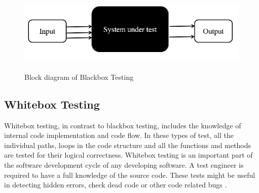 \documentclass[10pt]{ruthesis}
\begin{document}
\begin{figure}
  \centering
  \includegraphics[width=15cm,height=4cm]{bb.png}
  \caption{Block diagram of Blackbox Testing}
  \label{fig:bb}
\end{figure}


\subsection{Whitebox Testing}
Whitebox testing, in contrast to blackbox testing, includes the knowledge of internal code implementation and code flow. In these types of test, all the individual paths, loops in the code structure and all the functions and methods are tested for their logical correctness. Whitebox testing is an important part of the software development cycle of any developing software. A test engineer is required to have a full knowledge of the source code. These tests might be useful in detecting hidden errors, check dead code or other code related bugs \cite{ref25}.
\end{document}
